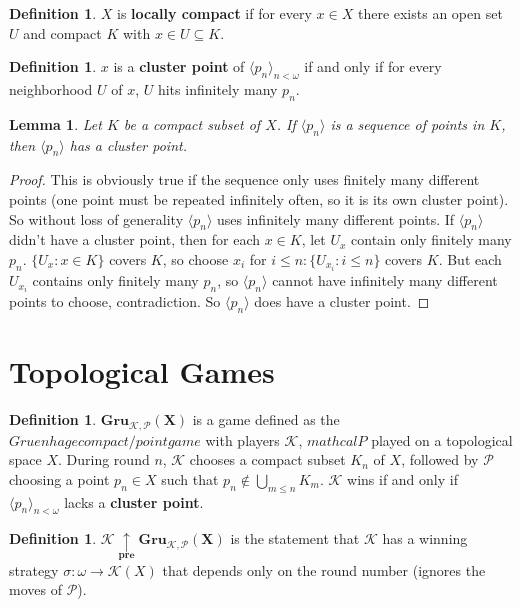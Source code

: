 \documentclass{amsart}
\theoremstyle{plain}
\newtheorem{lemma}[theorem]{Lemma}
\theoremstyle{definition}
\newtheorem{definition}[theorem]{Definition}
\theoremstyle{remark}
\begin{document}
	\begin{definition}
		$X$ is \textbf{locally compact} if for every $x \in X$ there exists an open set $U$ and compact $K$ with $x \in U \subseteq K$.
	\end{definition}
	
	\begin{definition}
		$x$ is a \textbf{cluster point} of $\langle p_n \rangle_{n < \omega}$ if and only if for every neighborhood $U$ of $x$, $U$ hits infinitely many $p_n$.
	\end{definition}

	\begin{lemma}
	Let $K$ be a compact subset of $X$. If $\langle p_n \rangle$ is a sequence of points in $K$, then $\langle p_n \rangle$ has a cluster point.
	\end{lemma}
	\begin{proof}
	This is obviously true if the sequence only uses finitely many different points (one point must be repeated infinitely often, so it is its own cluster point). So without loss of generality $\langle p_n \rangle$ uses infinitely many different points. If $\langle p_n \rangle$ didn't have a cluster point, then for each $x \in K$, let $U_x$ contain only finitely many $p_n$. $\lbrace U_x : x \in K \rbrace$ covers $K$, so choose $x_i$ for $i \leq n : \lbrace U_{x_i} : i \leq n \rbrace$ covers $K$. But each $U_{x_i}$ contains only finitely many $p_n$, so $\langle p_n \rangle$ cannot have infinitely many different points to choose, contradiction. So $\langle p_n \rangle$ does have a cluster point.
	\end{proof}


\section{Topological Games}

	\begin{definition}
		$\boldsymbol{Gru_{\mathcal{K},\mathcal{P}}(X)}$ is a game defined as the $Gruenhage compact/point game$ with players $\mathcal{K}$, $mathcal{P}$ played on a topological space $X$. During round $n$, $\mathcal{K}$ chooses a compact subset $K_n$ of $X$, followed by $\mathcal{P}$ choosing a point $p_n \in X$ such that $p_n \not\in \bigcup_{m\leq n}K_m$. $\mathcal{K}$ wins if and only if $\langle p_n \rangle_{n<\omega}$ lacks a \textbf{cluster point}. 
	\end{definition}
	
	\begin{definition}
	$\boldsymbol{\mathcal{K} \underset{pre}{\uparrow} Gru_{\mathcal{K}, \mathcal{P}}(X)}$ is the statement that $\mathcal{K}$ has a winning strategy $\sigma : \omega \rightarrow \mathcal{K}(X)$ that depends only on the round number (ignores the moves of $\mathcal{P}$).
	\end{definition}
\end{document}
